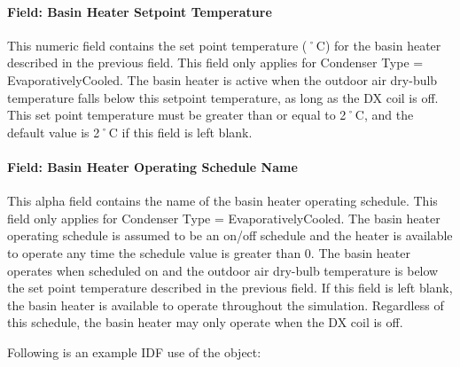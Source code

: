\paragraph{Field: Basin Heater Setpoint Temperature}\label{field-basin-heater-setpoint-temperature-2-000}

This numeric field contains the set point temperature (˚C) for the basin heater described in the previous field. This field only applies for Condenser Type = EvaporativelyCooled. The basin heater is active when the outdoor air dry-bulb temperature falls below this setpoint temperature, as long as the DX coil is off. This set point temperature must be greater than or equal to 2˚C, and the default value is 2˚C if this field is left blank.

\paragraph{Field: Basin Heater Operating Schedule Name}\label{field-basin-heater-operating-schedule-name-2-000}

This alpha field contains the name of the basin heater operating schedule. This field only applies for Condenser Type = EvaporativelyCooled. The basin heater operating schedule is assumed to be an on/off schedule and the heater is available to operate any time the schedule value is greater than 0. The basin heater operates when scheduled on and the outdoor air dry-bulb temperature is below the set point temperature described in the previous field. If this field is left blank, the basin heater is available to operate throughout the simulation. Regardless of this schedule, the basin heater may only operate when the DX coil is off.

Following is an example IDF use of the object:

